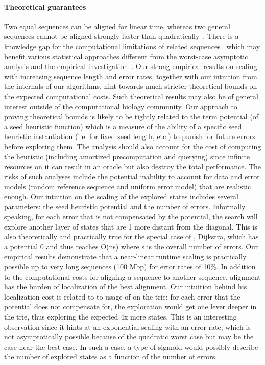 \paragraph{Theoretical guarantees}
Two equal sequences can be aligned for linear time, whereas two general
sequences cannot be aligned strongly faster than
quadratically~\cite{backurs2015edit}. There is a knowledge gap for the
computational limitations of related sequences~\citep{medvedev2022limitations}
which may benefit various statistical approaches different from the worst-case
asymptotic analysis and the empirical
investigation~\citep{medvedev2022theoretical}. Our strong empirical results on
scaling with increasing sequence length and error rates, together with our
intuition from the internals of our \A algorithms, hint towards much stricter
theoretical bounds on the expected computational costs. Such theoretical results
may also be of general interest outside of the computational biology community.
Our approach to proving theoretical bounds is likely to be tightly related to
the term potential (of a seed heuristic function) which is a measure of the
ability of a specific seed heuristic instantiation (i.e. for fixed seed length,
etc.) to punish for future errors before exploring them. The analysis should
also account for the cost of computing the heuristic (including amortized
precomputation and querying) since infinite resources on it can result in an
oracle but also destroy the total performance. The risks of such analyses
include the potential inability to account for data and error models (random
reference sequence and uniform error model) that are realistic enough. Our
intuition on the scaling of the explored states includes several parameters: the
seed heuristic potential and the number of errors. Informally speaking, for each
error that is not compensated by the potential, the \A search will explore
another layer of states that are 1 more distant from the diagonal. This is also
theoretically and practically true for the special case of \A, Dijkstra, which
has a potential 0 and thus reaches O(ns) where s is the overall number of
errors. Our empirical results demonstrate that a near-linear runtime scaling is
practically possible up to very long sequences (100 Mbp) for error rates of
10\%. In addition to the computational costs for aligning a sequence to another
sequence, alignment has the burden of localization of the best alignment. Our
intuition behind his localization cost is related to to usage of \A on the trie:
for each error that the \A potential does not compensate for, the exploration
would get one lever deeper in the trie, thus exploring the expected 4x more
states. This is an interesting observation since it hints at an exponential
scaling with an error rate, which is not asymptotically possible because of the
quadratic worst case but may be the case near the best case. In such a case, a
type of sigmoid would possibly describe the number of explored states as a
function of the number of errors.

